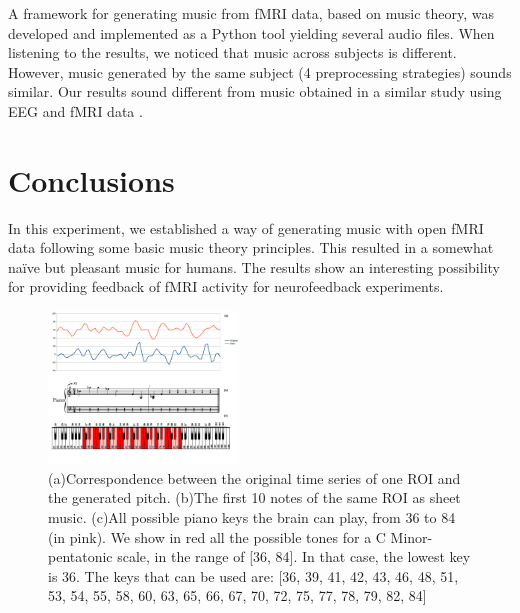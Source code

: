 \documentclass[twocolumn]{bmcart}%
\begin{document}
A framework for generating music from fMRI data, based on music theory,
was developed and implemented as a Python tool yielding several audio
files. When listening to the results, we noticed that music across
subjects is different. However, music generated by the same subject (4
preprocessing strategies) sounds similar. Our results sound different
from music obtained in a similar study using EEG and fMRI data
\cite{lu2012scale}.

\section{Conclusions}\label{conclusions}

In this experiment, we established a way of generating music with open
fMRI data following some basic music theory principles. This resulted in
a somewhat naïve but pleasant music for humans. The results show an
interesting possibility for providing feedback of fMRI activity for
neurofeedback experiments.

\begin{figure}
  \includegraphics[width=0.45\textwidth]{figure}
  \caption{\label{keyfig}
  (a)Correspondence between the original time series of one ROI and the generated pitch.
  (b)The first 10 notes of the same ROI as sheet music.
  (c)All possible piano keys the brain can play, from 36 to 84 (in pink).
    We show in red all the possible tones for a C Minor-pentatonic scale, in the range of [36, 84].
    In that case, the lowest key is 36.
    The keys that can be used are: [36, 39, 41, 42, 43, 46, 48, 51, 53, 54, 55, 58, 60, 63, 65, 66, 67, 70, 72, 75, 77, 78, 79, 82, 84]
      }
\end{figure}

\end{document}
